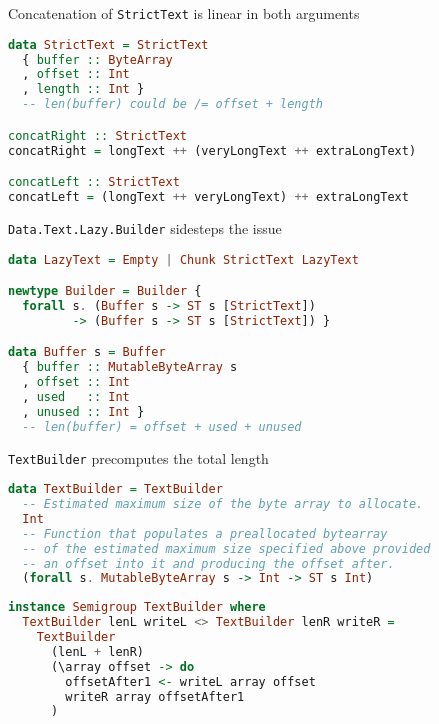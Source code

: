 \documentclass[handout]{beamer}
\begin{document}
\begin{frame}[fragile]{Concatenation of {\tt StrictText} is linear in both arguments}
\begin{lstlisting}[language=Haskell]
data StrictText = StrictText
  { buffer :: ByteArray
  , offset :: Int
  , length :: Int }
  -- len(buffer) could be /= offset + length

concatRight :: StrictText
concatRight = longText ++ (veryLongText ++ extraLongText)

concatLeft :: StrictText
concatLeft = (longText ++ veryLongText) ++ extraLongText
\end{lstlisting}
\end{frame}

\begin{frame}[fragile]{{\tt Data.Text.Lazy.Builder} sidesteps the issue}

\begin{lstlisting}[language=Haskell]
data LazyText = Empty | Chunk StrictText LazyText

newtype Builder = Builder {
  forall s. (Buffer s -> ST s [StrictText])
         -> (Buffer s -> ST s [StrictText]) }

data Buffer s = Buffer
  { buffer :: MutableByteArray s
  , offset :: Int
  , used   :: Int
  , unused :: Int }
  -- len(buffer) = offset + used + unused
\end{lstlisting}

\end{frame}


\begin{frame}[fragile]{{\tt TextBuilder} precomputes the total length}

\begin{lstlisting}[language=Haskell]
data TextBuilder = TextBuilder
  -- Estimated maximum size of the byte array to allocate.
  Int
  -- Function that populates a preallocated bytearray
  -- of the estimated maximum size specified above provided
  -- an offset into it and producing the offset after.
  (forall s. MutableByteArray s -> Int -> ST s Int)
\end{lstlisting}

\begin{lstlisting}[language=Haskell]
instance Semigroup TextBuilder where
  TextBuilder lenL writeL <> TextBuilder lenR writeR =
    TextBuilder
      (lenL + lenR)
      (\array offset -> do
        offsetAfter1 <- writeL array offset
        writeR array offsetAfter1
      )
\end{lstlisting}

\end{frame}
\end{document}
